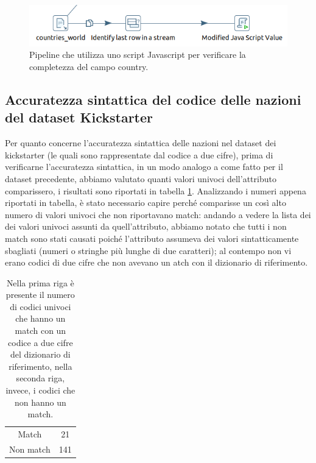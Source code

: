 \begin{figure}
	\centering
	\includegraphics[width=0.7\linewidth]{images/DQ_completezzacountry}
	\caption{Pipeline che utilizza uno script Javascript per verificare la completezza del campo country.}
	\label{fig:dqcompletezzacountry}
\end{figure}


\subsection{Accuratezza sintattica del codice delle nazioni del dataset Kickstarter}
Per quanto concerne l'accuratezza sintattica delle nazioni nel dataset dei kickstarter (le quali sono rappresentate dal codice a due cifre), prima di verificarne l'accuratezza sintattica, in un modo analogo a come fatto per il dataset precedente, abbiamo valutato quanti valori univoci dell'attributo comparissero, i risultati sono riportati in tabella \ref{tab:unique_code_country}.
Analizzando i numeri appena riportati in tabella, è stato necessario capire perché comparisse un così alto numero di valori univoci che non riportavano match: andando a vedere la lista dei dei valori univoci assunti da quell'attributo, abbiamo notato che tutti i non match sono stati causati poiché l'attributo assumeva dei valori sintatticamente sbagliati (numeri o stringhe più lunghe di due caratteri); al contempo non vi erano codici di due cifre che non avevano un atch con il dizionario di riferimento.

\begin{table}
	\caption{Nella prima riga è presente il numero di codici univoci che hanno un match con un codice a due cifre del dizionario di riferimento, nella seconda riga, invece, i codici che non hanno un match.}
	
	\label{tab:unique_code_country}
	
	\centering
	\begin{tabular}{c|c}
		Match & 21\\ 
		Non match & 141 \\
	\end{tabular}
\end{table} 

